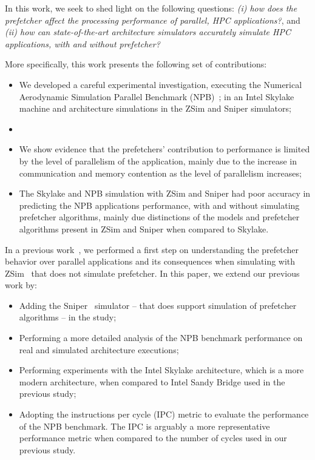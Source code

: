 \documentclass[AMA,final,STIX1COL]{WileyNJD-v2}
\newcommand\new[1]{{\color{red}{#1}}}
\begin{document}
In this work, we seek to shed light on the following questions: \textit{(i) how does the prefetcher affect the processing performance of parallel, HPC applications?}, and \textit{(ii) how can state-of-the-art architecture simulators accurately simulate HPC applications, with and without prefetcher?}

More specifically, this work presents the following set of contributions:
\begin{itemize}
    \item We developed a careful experimental investigation, executing the Numerical Aerodynamic Simulation Parallel Benchmark (NPB)~\cite{jin1999openmp};
    in an Intel Skylake machine and architecture simulations in the ZSim and Sniper simulators;
    \item \new{We show experimental evidence that an L2 memory prefetcher is more efficient in comparison with an L1 prefetcher, since avoiding excessive L3 cache accesses better contributes to performance, when comparing to accessing the L2 cache;}
    \item We show evidence that the prefetchers' contribution to performance is limited by the level of parallelism of the application, mainly due to the increase in communication and memory contention as the level of parallelism increases;
    \item The Skylake and NPB simulation with ZSim and Sniper had poor accuracy in predicting the NPB applications performance, with and without simulating prefetcher algorithms, mainly due distinctions of the models and prefetcher algorithms present in ZSim and Sniper when compared to Skylake.
\end{itemize}

In a previous work~\cite{girelli2019impacto}, we performed a first step on understanding the prefetcher behavior over parallel applications and its consequences when simulating with ZSim~\cite{sanchez2013zsim} that does not simulate prefetcher. In this paper, we extend our previous work by:

\begin{itemize}
    \item Adding the Sniper~\cite{carlson2014aeohmcm} simulator -- that does support simulation of prefetcher algorithms -- in the study;
    \item Performing a more detailed analysis of the NPB benchmark performance on real and simulated architecture executions;
    \item Performing experiments with the Intel Skylake architecture, which is a more modern architecture, when compared to Intel Sandy Bridge used in the previous study;
    \item Adopting the instructions per cycle (IPC) metric to evaluate the performance of the NPB benchmark. The IPC is arguably a more representative performance metric when compared to the number of cycles used in our previous study.
\end{itemize}
\end{document}
